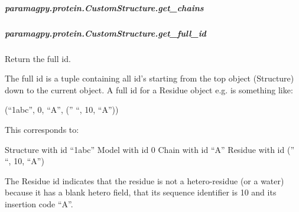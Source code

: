 \documentclass[a4paper,10pt,english]{sphinxmanual}
\begin{document}
\begin{fulllineitems}
\begin{fulllineitems}
\begin{fulllineitems}
\label{\detokenize{reference/generated/paramagpy.protein.CustomStructure.get_atoms:paramagpy.protein.CustomStructure.get_atoms}}
\end{fulllineitems}



\subparagraph{paramagpy.protein.CustomStructure.get\_chains}
\label{\detokenize{reference/generated/paramagpy.protein.CustomStructure.get_chains:paramagpy-protein-customstructure-get-chains}}\label{\detokenize{reference/generated/paramagpy.protein.CustomStructure.get_chains::doc}}

\begin{fulllineitems}
\label{\detokenize{reference/generated/paramagpy.protein.CustomStructure.get_chains:paramagpy.protein.CustomStructure.get_chains}}
\end{fulllineitems}



\subparagraph{paramagpy.protein.CustomStructure.get\_full\_id}
\label{\detokenize{reference/generated/paramagpy.protein.CustomStructure.get_full_id:paramagpy-protein-customstructure-get-full-id}}\label{\detokenize{reference/generated/paramagpy.protein.CustomStructure.get_full_id::doc}}

\begin{fulllineitems}
\label{\detokenize{reference/generated/paramagpy.protein.CustomStructure.get_full_id:paramagpy.protein.CustomStructure.get_full_id}}
Return the full id.

The full id is a tuple containing all id’s starting from
the top object (Structure) down to the current object. A full id for
a Residue object e.g. is something like:

(“1abc”, 0, “A”, (” “, 10, “A”))

This corresponds to:

Structure with id “1abc”
Model with id 0
Chain with id “A”
Residue with id (” “, 10, “A”)

The Residue id indicates that the residue is not a hetero-residue
(or a water) because it has a blank hetero field, that its sequence
identifier is 10 and its insertion code “A”.


\end{fulllineitems}
\end{fulllineitems}
\end{fulllineitems}
\end{document}
